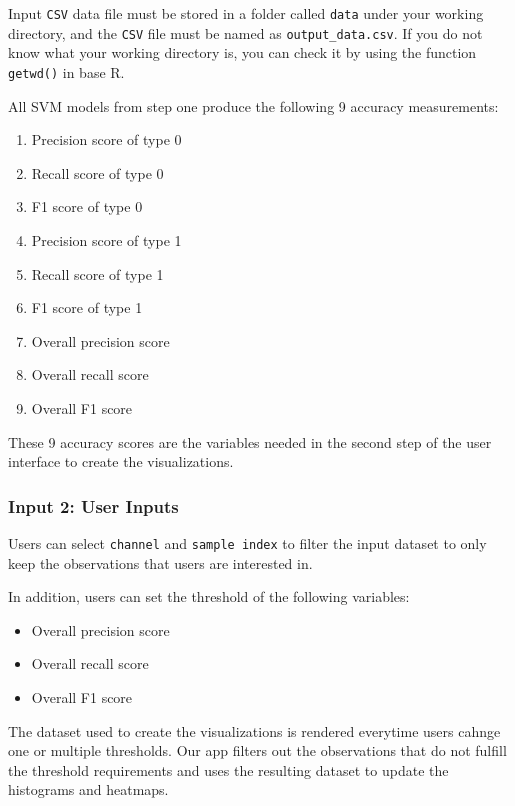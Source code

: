 \documentclass[10pt,letterpaper]{article}
\providecommand{\tightlist}{%
  \setlength{\itemsep}{0pt}\setlength{\parskip}{0pt}}
\begin{document}
Input \texttt{CSV} data file must be stored in a folder called
\texttt{data} under your working directory, and the \texttt{CSV} file
must be named as \texttt{output\_data.csv}. If you do not know what your
working directory is, you can check it by using the function
\texttt{getwd()} in base R.

All SVM models from step one produce the following 9 accuracy
measurements:

\begin{enumerate}
\def\labelenumi{\arabic{enumi}.}
\tightlist
\item
  Precision score of type 0
\item
  Recall score of type 0
\item
  F1 score of type 0
\item
  Precision score of type 1
\item
  Recall score of type 1
\item
  F1 score of type 1
\item
  Overall precision score
\item
  Overall recall score
\item
  Overall F1 score
\end{enumerate}

These 9 accuracy scores are the variables needed in the second step of
the user interface to create the visualizations.

\subsubsection{Input 2: User Inputs}\label{input-2-user-inputs}

Users can select \texttt{channel} and \texttt{sample\ index} to filter
the input dataset to only keep the observations that users are
interested in.

In addition, users can set the threshold of the following variables:

\begin{itemize}
\tightlist
\item
  Overall precision score
\item
  Overall recall score
\item
  Overall F1 score
\end{itemize}

The dataset used to create the visualizations is rendered everytime
users cahnge one or multiple thresholds. Our app filters out the
observations that do not fulfill the threshold requirements and uses the
resulting dataset to update the histograms and heatmaps.
\end{document}
